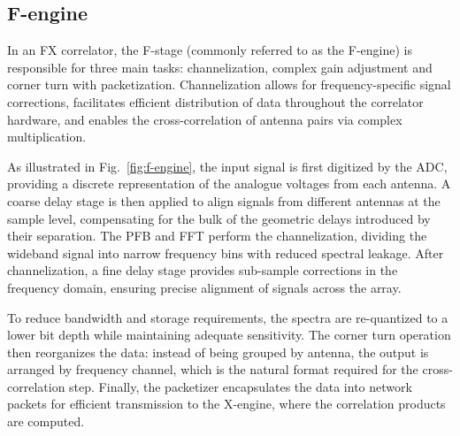 \subsection{F-engine}
In an FX correlator, the F-stage (commonly referred to as the F-engine) is responsible for three main tasks: channelization, complex gain adjustment and corner turn with packetization. Channelization allows for frequency-specific signal corrections, facilitates efficient distribution of data throughout the correlator hardware, and enables the cross-correlation of antenna pairs via complex multiplication.  

As illustrated in Fig.~\ref{fig:f-engine}, the input signal is first digitized by the ADC, providing a discrete representation of the analogue voltages from each antenna. A coarse delay stage is then applied to align signals from different antennas at the sample level, compensating for the bulk of the geometric delays introduced by their separation. The PFB and FFT perform the channelization, dividing the wideband signal into narrow frequency bins with reduced spectral leakage. After channelization, a fine delay stage provides sub-sample corrections in the frequency domain, ensuring precise alignment of signals across the array.  

To reduce bandwidth and storage requirements, the spectra are re-quantized to a lower bit depth while maintaining adequate sensitivity. The corner turn operation then reorganizes the data: instead of being grouped by antenna, the output is arranged by frequency channel, which is the natural format required for the cross-correlation step. Finally, the packetizer encapsulates the data into network packets for efficient transmission to the X-engine, where the correlation products are computed.

